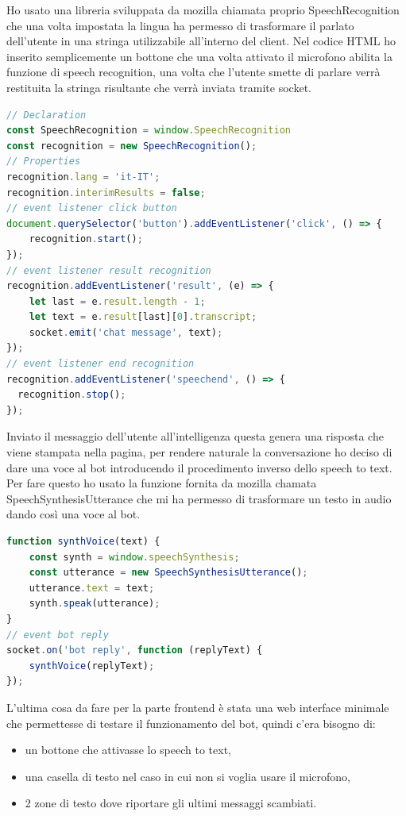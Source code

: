 Ho usato una libreria sviluppata da mozilla chiamata proprio SpeechRecognition che una volta impostata la lingua ha permesso di trasformare il parlato dell'utente in una stringa utilizzabile all'interno del client.
Nel codice HTML ho inserito semplicemente un bottone che una volta attivato il microfono abilita la funzione di speech recognition, una volta che l'utente smette di parlare verrà restituita la stringa risultante che verrà inviata tramite socket.
\begin{lstlisting}[language=JavaScript]
// Declaration
const SpeechRecognition = window.SpeechRecognition
const recognition = new SpeechRecognition();
// Properties
recognition.lang = 'it-IT';
recognition.interimResults = false;
// event listener click button
document.querySelector('button').addEventListener('click', () => {
    recognition.start();
});
// event listener result recognition
recognition.addEventListener('result', (e) => {
    let last = e.result.length - 1;
    let text = e.result[last][0].transcript;
    socket.emit('chat message', text);
});
// event listener end recognition
recognition.addEventListener('speechend', () => {
  recognition.stop();
});
\end{lstlisting}
Inviato il messaggio dell'utente all'intelligenza questa genera una risposta che viene stampata nella pagina, per rendere naturale la conversazione ho deciso di dare una voce al bot introducendo il procedimento inverso dello speech to text. Per fare questo ho usato la funzione fornita da mozilla chamata SpeechSynthesisUtterance che mi ha permesso di trasformare un testo in audio dando così una voce al bot.
\begin{lstlisting}[language=JavaScript]
function synthVoice(text) {
    const synth = window.speechSynthesis;
    const utterance = new SpeechSynthesisUtterance();
    utterance.text = text;
    synth.speak(utterance);
}
// event bot reply
socket.on('bot reply', function (replyText) {
    synthVoice(replyText);
});
\end{lstlisting}
L'ultima cosa da fare per la parte frontend è stata una web interface minimale che permettesse di testare il funzionamento del bot, quindi c'era bisogno di:
\begin{itemize}
\item un bottone che attivasse lo speech to text,
\item una casella di testo nel caso in cui non si voglia usare il microfono,
\item 2 zone di testo dove riportare gli ultimi messaggi scambiati.
\end{itemize}
